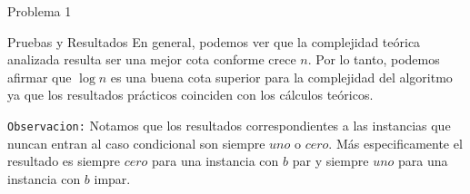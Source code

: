 \begin{section}{Problema 1}
\begin{subsection}{Pruebas y Resultados}
En general, podemos ver que la complejidad teórica analizada resulta ser una mejor cota conforme crece $n$. Por lo tanto, podemos afirmar que $\log n$ es una buena cota superior para la complejidad del algoritmo ya que los resultados prácticos coinciden con los cálculos teóricos.\VSP

\texttt{Observacion:}
Notamos que los resultados correspondientes a las instancias que nuncan entran al caso condicional son siempre $uno$ o $cero$. Más especificamente el resultado es siempre $cero$ para una instancia con $b$ par y siempre $uno$ para una instancia con $b$ impar.\VSP
	\end{subsection}

\end{section}


